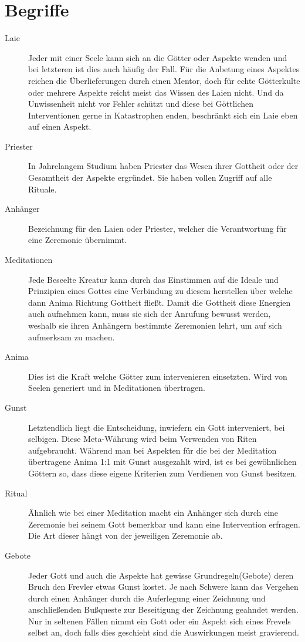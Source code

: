\documentclass[a4paper,12pt,oneside]{book}
\begin{document}
\section{Begriffe}
\begin{description}
\item[Laie]
Jeder mit einer Seele kann sich an die Götter oder Aspekte wenden und bei letzteren ist dies auch häufig der Fall. Für die Anbetung eines Aspektes reichen die Überlieferungen durch einen Mentor, doch für echte Götterkulte oder mehrere Aspekte reicht meist das Wissen des Laien nicht. Und da Unwissenheit nicht vor Fehler schützt und diese bei Göttlichen Interventionen gerne in Katastrophen enden, beschränkt sich ein Laie eben auf einen Aspekt.

\item[Priester]
In Jahrelangem Studium haben Priester das Wesen ihrer Gottheit oder der Gesamtheit der Aspekte ergründet. Sie haben vollen Zugriff auf alle Rituale.

\item[Anhänger]
Bezeichnung für den Laien oder Priester, welcher die Verantwortung für eine Zeremonie übernimmt.

\item[Meditationen]
Jede Beseelte Kreatur kann durch das Einstimmen auf die Ideale und Prinzipien eines Gottes eine Verbindung zu diesem herstellen über welche dann Anima Richtung Gottheit fließt. Damit die Gottheit diese Energien auch aufnehmen kann, muss sie sich der Anrufung bewusst werden, weshalb sie ihren Anhängern bestimmte Zeremonien lehrt, um auf sich aufmerksam zu machen.

\item[Anima]
Dies ist die Kraft welche Götter zum intervenieren einsetzten. Wird von Seelen generiert und in Meditationen übertragen.

\item[Gunst]
Letztendlich liegt die Entscheidung, inwiefern ein Gott interveniert, bei selbigen. Diese Meta-Währung wird beim Verwenden von Riten aufgebraucht.
Während man bei Aspekten für die bei der Meditation übertragene Anima 1:1 mit Gunst ausgezahlt wird, ist es bei gewöhnlichen Göttern so, dass diese eigene Kriterien zum Verdienen von Gunst besitzen.

\item[Ritual]
Ähnlich wie bei einer Meditation macht ein Anhänger sich durch eine Zeremonie bei seinem Gott bemerkbar und kann eine Intervention erfragen. Die Art dieser hängt von der jeweiligen Zeremonie ab.

\item[Gebote]
Jeder Gott und auch die Aspekte hat gewisse Grundregeln(Gebote) deren Bruch den Frevler etwas Gunst kostet. Je nach Schwere kann das Vergehen durch einen Anhänger durch die Auferlegung einer Zeichnung und anschließenden Bußqueste zur Beseitigung der Zeichnung geahndet werden. Nur in seltenen Fällen nimmt ein Gott oder ein Aspekt sich eines Frevels selbst an, doch falls dies geschieht sind die Auswirkungen meist gravierend.

\end{description}
\end{document}
